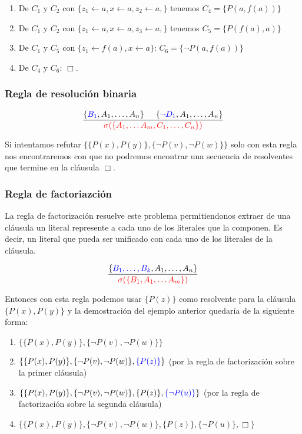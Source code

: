 \begin{centrado}
\begin{enumerate}
\item De $C_1$ y $C_2$ con $\{z_1\leftarrow a, x\leftarrow a, z_2\leftarrow a,\}$ tenemos $C_4 = \{ P(a,f(a))\}$
\item De $C_1$ y $C_2$ con $\{z_1\leftarrow a, x\leftarrow a, z_3\leftarrow a,\}$ tenemos $C_5 = \{ P(f(a),a)\}$
\item De $C_1$ y $C_5$ con $\{z_1 \leftarrow f(a), x\leftarrow a\}$: $C_6 = \{ \lnot P(a,f(a))\}$
\item De $C_4$ y $C_6$: $\Box$.
\end{enumerate}
\end{centrado}
\subsubsection{Regla de resolución binaria}

$$\frac{\{\color{blue}B_1\color{black},A_1,\dots,A_n\}\hspace*{5mm}\{\color{blue}\lnot D_1\color{black},A_1,\dots,A_n\}}{{\color{red}\sigma(\{A_1,\dots A_m, C_1,\dots,C_n\})}}$$

\hspace*{5mm}
Si intentamos refutar $\{\{P(x), P(y)\}, \{\lnot P(v), \lnot P(w)\}\}$ solo con esta regla nos encontraremos con que no podremos encontrar una secuencia de resolventes que termine en la cláusula $\Box$.

\subsubsection*{Regla de factoriazción}
La regla de factorización resuelve este problema permitiendonos extraer de una cláusula un literal represente a cada uno de los literales que la componen. Es decir, un literal que pueda ser unificado con cada uno de los literales de la cláusula.

$$\frac{\{\color{blue}B_1,\dots,B_k\color{black},A_1,\dots,A_n\}}{{\color{red}\sigma(\{B_1,A_1,\dots A_m\})}}$$

\hspace*{5mm}

Entonces con esta regla podemos usar $\{P(z)\}$ como resolvente para la cláusula $\{P(x), P(y)\}$ y la demostración del ejemplo anterior quedaría de la siguiente forma:

\begin{enumerate}
\item $\{\{P(x), P(y)\}, \{\lnot P(v), \lnot P(w)\}\}$
\item $\{\{P(x), P(y)\}, \{\lnot P(v), \lnot P(w)\}, \color{blue}\{P(z)\}\color{black}\}$ (por la regla de factorización sobre la primer cláusula)
\item $\{\{P(x), P(y)\}, \{\lnot P(v), \lnot P(w)\}, \{P(z)\}, \color{blue}\{\lnot P(u)\}\color{black}\}$ (por la regla de factorización sobre la segunda cláusula)
\item $\{\{P(x), P(y)\}, \{\lnot P(v), \lnot P(w)\}, \{P(z)\}, \{\lnot P(u)\}, \Box\}$
\end{enumerate}